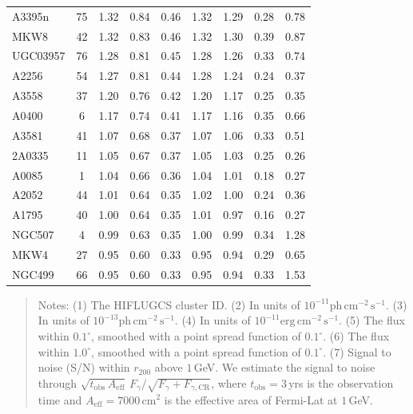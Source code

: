 \documentclass[10pt,aps,pra,reprint,amsmath,amsfonts,amssymb,showpacs,nofootinbib,floatfix]{revtex4-1}
\newcommand{\rmn}{\mathrm}
\newcommand{\cm}{\rmn{cm}}
\newcommand{\vstt}{\vspace{-0.0mm}}
\newcommand{\CR}{\rmn{CR}}
\newcommand{\rvir}{r_{200}}
\begin{document}
{\begin{table}
\begin{minipage}{2.0\columnwidth}
\begin{tabular}{l c c c c c c c c}
A3395n   &  75 &   1.32 &   0.84 &   0.46 &   1.32 &   1.29 &   0.28 &   0.78 \vstt \\
MKW8     &  42 &   1.32 &   0.83 &   0.46 &   1.32 &   1.30 &   0.39 &   0.87 \vstt \\
UGC03957 &  76 &   1.28 &   0.81 &   0.45 &   1.28 &   1.26 &   0.33 &   0.74 \vstt \\
A2256    &  54 &   1.27 &   0.81 &   0.44 &   1.28 &   1.24 &   0.24 &   0.37 \vstt \\
A3558    &  37 &   1.20 &   0.76 &   0.42 &   1.20 &   1.17 &   0.25 &   0.35 \vstt \\
A0400    &   6 &   1.17 &   0.74 &   0.41 &   1.17 &   1.16 &   0.35 &   0.66 \vstt \\
A3581    &  41 &   1.07 &   0.68 &   0.37 &   1.07 &   1.06 &   0.33 &   0.51 \vstt \\
2A0335   &  11 &   1.05 &   0.67 &   0.37 &   1.05 &   1.03 &   0.25 &   0.26 \vstt \\
A0085    &   1 &   1.04 &   0.66 &   0.36 &   1.04 &   1.01 &   0.18 &   0.27 \vstt \\
A2052    &  44 &   1.01 &   0.64 &   0.35 &   1.02 &   1.00 &   0.24 &   0.36 \vstt \\
A1795    &  40 &   1.00 &   0.64 &   0.35 &   1.01 &   0.97 &   0.16 &   0.27 \vstt \\
NGC507   &   4 &   0.99 &   0.63 &   0.35 &   1.00 &   0.99 &   0.34 &   1.28 \vstt \\
MKW4     &  27 &   0.95 &   0.60 &   0.33 &   0.95 &   0.94 &   0.29 &   0.65 \vstt \\
NGC499   &  66 &   0.95 &   0.60 &   0.33 &   0.95 &   0.94 &   0.33 &   1.53 \vstt \\
\hline
\hline
\end{tabular}
\begin{quote}
  Notes:
   (1) The HIFLUGCS cluster ID.
   (2) In units of $10^{-11} \rmn{ph}\,\rmn{cm}^{-2}\,\rmn{s}^{-1}$.
   (3) In units of $10^{-13} \rmn{ph}\,\rmn{cm}^{-2}\,\rmn{s}^{-1}$.
   (4) In units of $10^{-11} \rmn{erg}\,\rmn{cm}^{-2}\,\rmn{s}^{-1}$.
   (5) The flux within $0.1^\circ$, smoothed with a point spread function of $0.1^\circ$.
   (6) The flux within $1.0^\circ$, smoothed with a point spread function of $0.1^\circ$.
   (7) Signal to noise (S/N) within $\rvir$ above $1\,$GeV. We estimate the signal to
  noise through $\sqrt{t_\rmn{obs}\,A_\rmn{eff}}\,F_{\gamma}/\sqrt{F_{\gamma}+F_{\gamma,\CR}}$,
  where $t_\rmn{obs}=3\,$yrs is the observation time and $A_\rmn{eff} = 7000\,\cm^2$
    is the effective area of Fermi-Lat at $1\,$GeV.
  \label{tab:flux_tab_BM}
  \end{quote}
\end{minipage}
\end{table}


}
\end{document}
